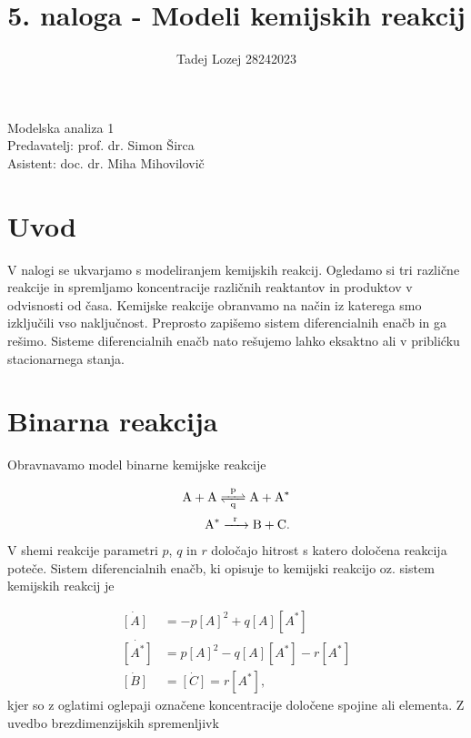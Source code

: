 \documentclass[slovene,11pt,a4paper]{article}
\begin{document}
\title{5. naloga - Modeli kemijskih reakcij}
\author{Tadej Lozej 28242023}
\maketitle
\begin{center}
Modelska analiza 1 \\
\bigskip
Predavatelj: prof. dr. Simon Širca \\
Asistent: doc. dr. Miha Mihovilovič
\end{center}

\newpage

\tableofcontents

\newpage

\section{Uvod}


V nalogi se ukvarjamo s modeliranjem kemijskih reakcij. Ogledamo si tri različne reakcije in spremljamo koncentracije različnih reaktantov in produktov v odvisnosti od časa. Kemijske reakcije obranvamo na način iz katerega smo izključili vso naključnost. Preprosto zapišemo sistem diferencialnih enačb in ga rešimo. Sisteme diferencialnih enačb nato rešujemo lahko eksaktno ali v priblićku stacionarnega stanja.

\section{Binarna reakcija}

Obravnavamo model binarne kemijske reakcije

\begin{align}
\ce{A + A <=>[p][q] A + A^*} \\
\ce{A^* ->[r] B + C}.
\end{align}
V shemi reakcije parametri $p$, $q$ in $r$ določajo hitrost s katero določena reakcija poteče. Sistem diferencialnih enačb, ki opisuje to kemijski reakcijo oz. sistem kemijskih reakcij je

\begin{align}
\dot{[A]} &= -p [A]^2 + q[A][A^*] \\
\dot{[A^*]} &= p [A]^2 - q [A][A^*] - r[A^*] \\
\dot{[B]} &= \dot{[C]} = r [A^*],
\end{align}
kjer so z oglatimi oglepaji označene koncentracije določene spojine ali elementa. Z uvedbo brezdimenzijskih spremenljivk
\end{document}
